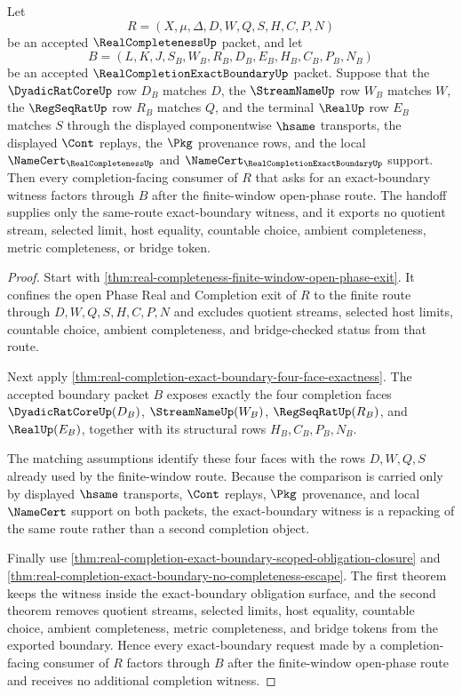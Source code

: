 \begin{theorem}
\label{thm:real-completeness-exact-boundary-handoff}
Let
$$
R=(X,\mu,\Delta,D,W,Q,S,H,C,P,N)
$$
be an accepted $\RealCompletenessUp$ packet, and let
$$
B=(L,K,J,S_B,W_B,R_B,D_B,E_B,H_B,C_B,P_B,N_B)
$$
be an accepted $\RealCompletionExactBoundaryUp$ packet. Suppose that the $\DyadicRatCoreUp$ row $D_B$ matches $D$, the $\StreamNameUp$ row $W_B$ matches $W$, the $\RegSeqRatUp$ row $R_B$ matches $Q$, and the terminal $\RealUp$ row $E_B$ matches $S$ through the displayed componentwise $\hsame$ transports, the displayed $\Cont$ replays, the $\Pkg$ provenance rows, and the local $\NameCert_{\RealCompletenessUp}$ and $\NameCert_{\RealCompletionExactBoundaryUp}$ support. Then every completion-facing consumer of $R$ that asks for an exact-boundary witness factors through $B$ after the finite-window open-phase route. The handoff supplies only the same-route exact-boundary witness, and it exports no quotient stream, selected limit, host equality, countable choice, ambient completeness, metric completeness, or bridge token.
\end{theorem}
\begin{proof}
Start with \autoref{thm:real-completeness-finite-window-open-phase-exit}. It confines the open Phase Real and Completion exit of $R$ to the finite route through $D,W,Q,S,H,C,P,N$ and excludes quotient streams, selected host limits, countable choice, ambient completeness, and bridge-checked status from that route.

Next apply \autoref{thm:real-completion-exact-boundary-four-face-exactness}. The accepted boundary packet $B$ exposes exactly the four completion faces $\DyadicRatCoreUp(D_B)$, $\StreamNameUp(W_B)$, $\RegSeqRatUp(R_B)$, and $\RealUp(E_B)$, together with its structural rows $H_B,C_B,P_B,N_B$.

The matching assumptions identify these four faces with the rows $D,W,Q,S$ already used by the finite-window route. Because the comparison is carried only by displayed $\hsame$ transports, $\Cont$ replays, $\Pkg$ provenance, and local $\NameCert$ support on both packets, the exact-boundary witness is a repacking of the same route rather than a second completion object.

Finally use \autoref{thm:real-completion-exact-boundary-scoped-obligation-closure} and \autoref{thm:real-completion-exact-boundary-no-completeness-escape}. The first theorem keeps the witness inside the exact-boundary obligation surface, and the second theorem removes quotient streams, selected limits, host equality, countable choice, ambient completeness, metric completeness, and bridge tokens from the exported boundary. Hence every exact-boundary request made by a completion-facing consumer of $R$ factors through $B$ after the finite-window open-phase route and receives no additional completion witness.
\end{proof}

